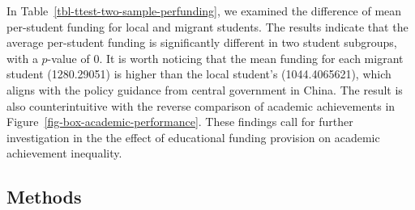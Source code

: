 \documentclass[
  man,
  floatsintext,
  longtable,
  nolmodern,
  notxfonts,
  notimes,
  colorlinks=true,linkcolor=blue,citecolor=blue,urlcolor=blue]{apa7}
\begin{document}
\begin{table}

{\caption{{}{\label{tbl-ttest-two-sample-perfunding}}}
\vspace{-20pt}}

\centering
{}

\end{table}

In Table~\ref{tbl-ttest-two-sample-perfunding}, we examined the
difference of mean per-student funding for local and migrant students.
The results indicate that the average per-student funding is
significantly different in two student subgroups, with a \(p\)-value of
0. It is worth noticing that the mean funding for each migrant student
(1280.29051) is higher than the local student's (1044.4065621), which
aligns with the policy guidance from central government in China. The
result is also counterintuitive with the reverse comparison of academic
achievements in Figure~\ref{fig-box-academic-performance}. These
findings call for further investigation in the the effect of educational
funding provision on academic achievement inequality.

\subsection{Methods}\label{methods}
\end{document}
